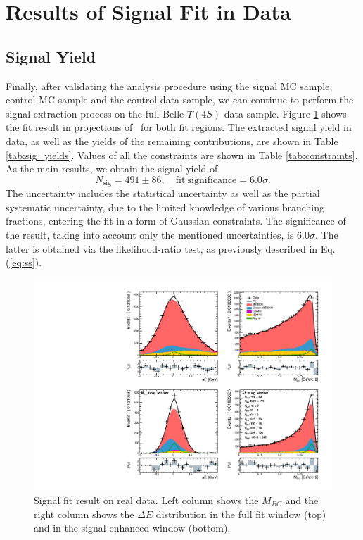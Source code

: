 \section{Results of Signal Fit in Data}\label{sec:final-results-from-data}

\subsection{Signal Yield}

Finally, after validating the analysis procedure using the signal MC sample, control MC sample and the control data sample, we can continue to perform the signal extraction process on the full Belle $\Upsilon(4S)$ data sample. Figure \ref{fig:sig_fit_data} shows the fit result in projections of \vars~for both fit regions. The extracted signal yield in data, as well as the yields of the remaining contributions, are shown in Table \ref{tab:sig_yields}. Values of all the constraints are shown in Table \ref{tab:constraints}. As the main results, we obtain the signal yield of 
\begin{equation}
\label{eq:main_result}
N_{\mathrm{sig}} = 491 \pm 86,\quad\mathrm{fit~significance} = 6.0\sigma.
\end{equation}
The uncertainty includes the statistical uncertainty as well as the partial systematic uncertainty, due to the limited knowledge of various branching fractions, entering the fit in a form of Gaussian constraints. The significance of the result, taking into account only the mentioned uncertainties, is $6.0\sigma$. The latter is obtained via the likelihood-ratio test, as previously described in Eq. (\ref{eq:ss}).

\begin{figure}[H]
	\centering
	\captionsetup{width=0.8\linewidth}
	\includegraphics[width=\linewidth]{fig/sig_fit_data}
	\caption{Signal fit result on real data. Left column shows the $M_{BC}$ and the right column shows the $\Delta E$ distribution in the full fit window (top) and in the signal enhanced window (bottom).}
	\label{fig:sig_fit_data}
\end{figure} 


